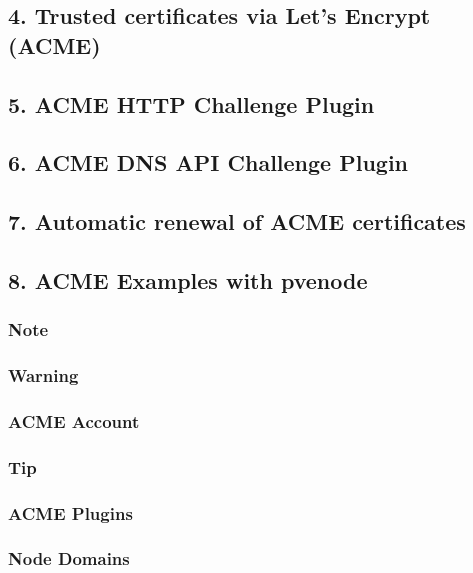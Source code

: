 \subsection{4. Trusted certificates via Let’s Encrypt (ACME)}

\subsection{5. ACME HTTP Challenge Plugin}

\subsection{6. ACME DNS API Challenge Plugin}

\subsection{7. Automatic renewal of ACME certificates}

\subsection{8. ACME Examples with pvenode}

\subsubsection{Note}

\subsubsection{Warning}

\subsubsection{ACME Account}

\subsubsection{Tip}

\subsubsection{ACME Plugins}

\subsubsection{Node Domains}

